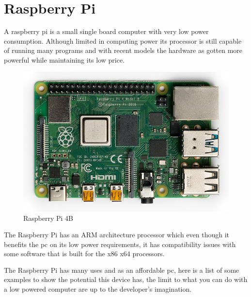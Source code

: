 \section{Raspberry Pi}\label{sec:chap3_rasp}
A raspberry pi is a small single board computer with very low power consumption. Although limited in computing power its processor is still capable of running many programs and with recent models the hardware as gotten more powerful while maintaining its low price.\\

\begin{center}
	\begin{figure}[h!]
		\centering
		\includegraphics[scale=0.32]{./images/3-rasp-4}
		\caption{Raspberry Pi 4B}
		\label{rasp}
	\end{figure}
\end{center}

The Raspberry Pi has an ARM architecture processor which even though it benefits the pc on its low power requirements, it has compatibility issues with some software that is built for the x86 x64 processors.

The Raspberry Pi has many uses and as an affordable pc, here is a list of some examples to show the potential this device has, the limit to what you can do with a low powered computer are up to the developer’s imagination.

